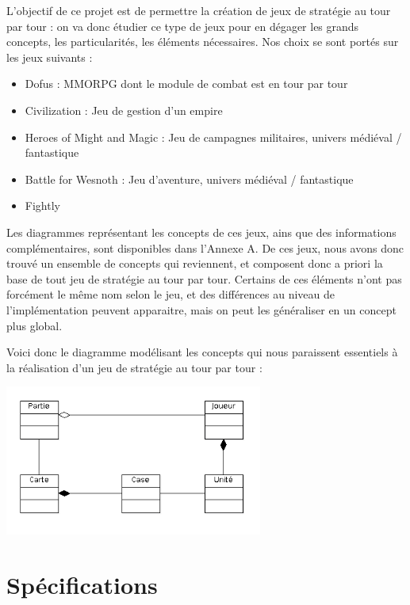 \documentclass[a4paper,10pt]{report}
\begin{document}
      L'objectif de ce projet est de permettre la création de jeux de stratégie au tour par tour : on va donc étudier ce type de jeux pour en dégager les grands concepts, les particularités, les éléments nécessaires. Nos choix se sont portés sur les jeux suivants : 

      \begin{itemize}
        \item Dofus : MMORPG dont le module de combat est en tour par tour
        \item Civilization : Jeu de gestion d'un empire
        \item Heroes of Might and Magic : Jeu de campagnes militaires, univers médiéval / fantastique
        \item Battle for Wesnoth : Jeu d'aventure, univers médiéval / fantastique
        \item Fightly
      \end{itemize}

      Les diagrammes représentant les concepts de ces jeux, ains que des informations complémentaires, sont disponibles dans l'Annexe A. De ces jeux, nous avons donc trouvé un ensemble de concepts qui reviennent, et composent donc a priori la base de tout jeu de stratégie au tour par tour. Certains de ces éléments n'ont pas forcément le même nom selon le jeu, et des différences au niveau de l'implémentation peuvent apparaitre, mais on peut les généraliser en un concept plus global. 

      Voici donc le diagramme modélisant les concepts qui nous paraissent essentiels à la réalisation d'un jeu de stratégie au tour par tour : 
      
      \includegraphics[width=320px]{diagrammes/concept-fightly.png}



    \section{Spécifications}
\end{document}
